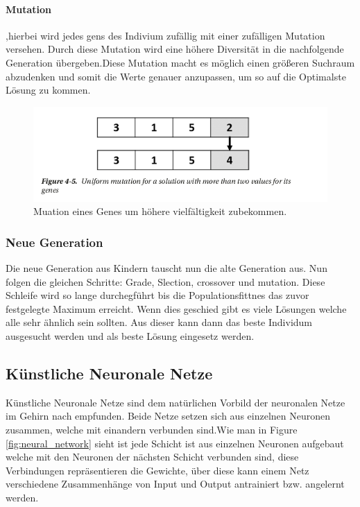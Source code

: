 \paragraph{Mutation},hierbei wird jedes gens des Indivium zufällig mit einer zufälligen Mutation versehen. Durch diese Mutation wird eine höhere Diversität in die nachfolgende Generation übergeben.Diese Mutation macht es möglich einen größeren Suchraum abzudenken und somit die Werte genauer anzupassen, um so auf die Optimalste Lösung zu kommen. 

\begin{figure}[H]
  \centering  
  \includegraphics[scale=0.5]{img/mutation.png}
  \caption{Muation eines Genes um höhere vielfältigkeit zubekommen.\cite{Rashid2017} }
  \label{fig:chromoson_mutation}
\end{figure}


\subsubsection{Neue Generation}
Die neue Generation aus Kindern tauscht nun die alte Generation aus. Nun folgen die gleichen Schritte: Grade, Slection, crossover und mutation. 
Diese Schleife wird so lange durchegführt bis die Populationsfittnes das zuvor festgelegte Maximum erreicht. Wenn dies geschied gibt es viele Lösungen welche alle sehr ähnlich sein sollten. Aus dieser kann dann das beste Individum ausgesucht werden und als beste Lösung eingesetz werden. 

\newpage
\subsection{Künstliche Neuronale Netze}

Künstliche Neuronale Netze sind dem natürlichen Vorbild der neuronalen Netze im Gehirn nach empfunden. Beide Netze setzen sich aus einzelnen Neuronen zusammen, welche mit einandern verbunden sind.Wie man in Figure \ref{fig:neural_network} sieht ist jede Schicht ist aus einzelnen Neuronen aufgebaut welche mit den Neuronen der nächsten Schicht verbunden sind, diese Verbindungen repräsentieren die Gewichte, über diese kann einem Netz verschiedene Zusammenhänge von Input und Output antrainiert bzw. angelernt werden.

